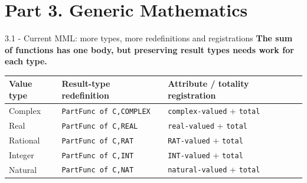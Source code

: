 \documentclass[aspectratio=169,11pt]{beamer}
\begin{document}
\section{Part 3. Generic Mathematics}
\begin{frame}[fragile,t]{3.1 - Current MML: more types, more redefinitions and registrations}
\textcolor{blue!55!black}{\textbf{The sum of functions has one body, but preserving result types needs work for each type.}}

\par{}
\begin{scriptsize}
\setlength{\tabcolsep}{3pt}
\renewcommand{\arraystretch}{1.15}
\begin{tabular}{lll}
\toprule
\textbf{Value type} & \textbf{Result-type redefinition} & \textbf{Attribute / totality registration} \\
\midrule
Complex & \texttt{PartFunc of C,COMPLEX} & \texttt{complex-valued} + \texttt{total} \\
Real & \texttt{PartFunc of C,REAL} & \texttt{real-valued} + \texttt{total} \\
Rational & \texttt{PartFunc of C,RAT} & \texttt{RAT-valued} + \texttt{total} \\
Integer & \texttt{PartFunc of C,INT} & \texttt{INT-valued} + \texttt{total} \\
Natural & \texttt{PartFunc of C,NAT} & \texttt{natural-valued} + \texttt{total} \\
\bottomrule
\end{tabular}
\end{scriptsize}


\end{frame}
\end{document}
